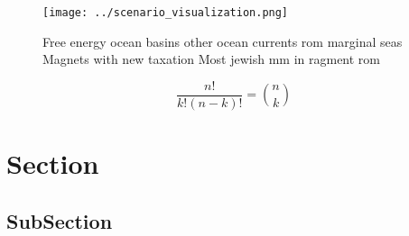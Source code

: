 \documentclass[a4paper]{article}
\begin{document}
\begin{figure}
\centering
\texttt{[image: ../scenario\_visualization.png]}
\caption{Free energy ocean basins other ocean currents rom marginal seas Magnets with new taxation Most jewish mm in ragment rom
}
\end{figure}
 
\[ \frac{n!}{k!(n-k)!} = \binom{n}{k} \]

\section{Section}

\subsection{SubSection}
\end{document}
